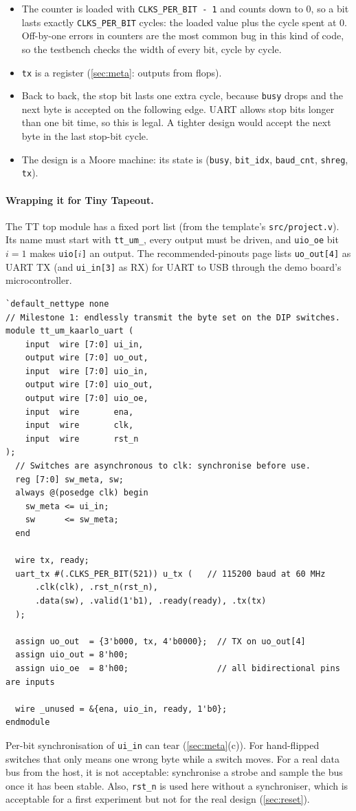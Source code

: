 \begin{itemize}
  \item The counter is loaded with \texttt{CLKS\_PER\_BIT - 1} and counts
    down to 0, so a bit lasts exactly \texttt{CLKS\_PER\_BIT} cycles: the loaded value
    plus the cycle spent at 0. Off-by-one errors in counters are the most
    common bug in this kind of code, so the testbench checks the width of
    every bit, cycle by cycle.
  \item \texttt{tx} is a register (\cref{sec:meta}: outputs from flops).
  \item Back to back, the stop bit lasts one extra cycle, because
    \texttt{busy} drops and the next byte is accepted on the following edge.
    UART allows stop bits longer than one bit time, so this is legal. A
    tighter design would accept the next byte in the last stop-bit cycle.
  \item The design is a Moore machine: its state is (\texttt{busy},
    \texttt{bit\_idx}, \texttt{baud\_cnt}, \texttt{shreg}, \texttt{tx}).
\end{itemize}

\paragraph{Wrapping it for Tiny Tapeout.} The TT top module has a fixed port
list (from the template's \texttt{src/project.v}). Its name must start with
\texttt{tt\_um\_}, every output must be driven, and \texttt{uio\_oe} bit
$i=1$ makes \texttt{uio[$i$]} an output. The recommended-pinouts page lists
\texttt{uo\_out[4]} as UART TX (and \texttt{ui\_in[3]} as RX) for UART to USB
through the demo board's microcontroller.
{\small
\begin{verbatim}
`default_nettype none
// Milestone 1: endlessly transmit the byte set on the DIP switches.
module tt_um_kaarlo_uart (
    input  wire [7:0] ui_in,
    output wire [7:0] uo_out,
    input  wire [7:0] uio_in,
    output wire [7:0] uio_out,
    output wire [7:0] uio_oe,
    input  wire       ena,
    input  wire       clk,
    input  wire       rst_n
);
  // Switches are asynchronous to clk: synchronise before use.
  reg [7:0] sw_meta, sw;
  always @(posedge clk) begin
    sw_meta <= ui_in;
    sw      <= sw_meta;
  end

  wire tx, ready;
  uart_tx #(.CLKS_PER_BIT(521)) u_tx (   // 115200 baud at 60 MHz
      .clk(clk), .rst_n(rst_n),
      .data(sw), .valid(1'b1), .ready(ready), .tx(tx)
  );

  assign uo_out  = {3'b000, tx, 4'b0000};  // TX on uo_out[4]
  assign uio_out = 8'h00;
  assign uio_oe  = 8'h00;                  // all bidirectional pins are inputs

  wire _unused = &{ena, uio_in, ready, 1'b0};
endmodule
\end{verbatim}
}
Per-bit synchronisation of \texttt{ui\_in} can tear (\cref{sec:meta}(c)).
For hand-flipped switches that only means one wrong byte while a switch
moves. For a real data bus from the host, it is not acceptable: synchronise
a strobe and sample the bus once it has been stable. Also,
\texttt{rst\_n} is used here without a synchroniser, which is acceptable for
a first experiment but not for the real design (\cref{sec:reset}).

